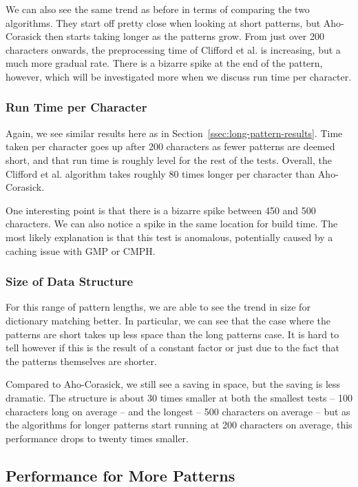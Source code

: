 \documentclass[ %
                    author={Dominic Joseph Moylett},
                    degree={MEng},
                     title={Dictionary Matching with Fingerprints},
                  subtitle={An Empirical Analysis},
                      type={research},
                      year={2015} ]{dissertation}
\begin{document}
We can also see the same trend as before in terms of comparing the two algorithms. They start off pretty close when looking at short patterns, but Aho-Corasick then starts taking longer as the patterns grow. From just over 200 characters onwards, the preprocessing time of Clifford et al. is increasing, but a much more gradual rate. There is a bizarre spike at the end of the pattern, however, which will be investigated more when we discuss run time per character.

\subsubsection{Run Time per Character}

Again, we see similar results here as in Section~\ref{ssec:long-pattern-results}. Time taken per character goes up after 200 characters as fewer patterns are deemed short, and that run time is roughly level for the rest of the tests. Overall, the Clifford et al. algorithm takes roughly 80 times longer per character than Aho-Corasick.

One interesting point is that there is a bizarre spike between 450 and 500 characters. We can also notice a spike in the same location for build time. The most likely explanation is that this test is anomalous, potentially caused by a caching issue with GMP or CMPH.

\subsubsection{Size of Data Structure}

For this range of pattern lengths, we are able to see the trend in size for dictionary matching better. In particular, we can see that the case where the patterns are short takes up less space than the long patterns case. It is hard to tell however if this is the result of a constant factor or just due to the fact that the patterns themselves are shorter.

Compared to Aho-Corasick, we still see a saving in space, but the saving is less dramatic. The structure is about 30 times smaller at both the smallest tests -- 100 characters long on average -- and the longest -- 500 characters on average -- but as the algorithms for longer patterns start running at 200 characters on average, this performance drops to twenty times smaller.

\subsection{Performance for More Patterns}
\label{ssec:many-pattern-results}
\end{document}
